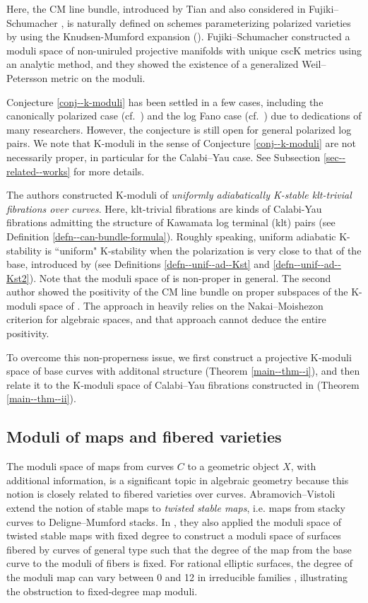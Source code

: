 \documentclass[12pt,twoside]{amsart}
\theoremstyle{definition}
\begin{document}
Here, the CM line bundle, introduced by Tian \cite{Tia97} and also considered in Fujiki--Schumacher \cite{FS}, is naturally defined on schemes parameterizing polarized varieties by using the Knudsen-Mumford expansion (\cite{PT,FR}). 
Fujiki--Schumacher \cite{FS} constructed a moduli space of non-uniruled projective manifolds with unique cscK metrics using an analytic method, and they showed the existence of a generalized Weil--Petersson metric on the moduli. 

Conjecture \ref{conj--k-moduli} has been settled in a few cases, including the canonically polarized case (cf.~\cite{kollar-moduli}) and the log Fano case (cf.~\cite{Xu}) due to dedications of many researchers. 
However, the conjecture is still open for general polarized log pairs.
We note that K-moduli in the sense of Conjecture \ref{conj--k-moduli} are not necessarily proper, in particular for the Calabi--Yau case.
See Subsection \ref{sec--related--works} for more details.


The authors \cite{HH} constructed K-moduli of {\it uniformly adiabatically K-stable klt-trivial fibrations over curves}. Here, klt-trivial fibrations are kinds of Calabi-Yau fibrations admitting the structure of Kawamata log terminal (klt) pairs (see Definition \ref{defn--can-bundle-formula}). Roughly speaking, uniform adiabatic K-stability is ``uniform" K-stability when the polarization is very close to that of the base, introduced by \cite{fibst} (see Definitions \ref{defn--unif--ad--Kst} and \ref{defn--unif--ad--Kst2}). Note that the moduli space of \cite{HH} is non-proper in general.
The second author \cite{Hat23} showed the positivity of the CM line bundle on proper subspaces of the K-moduli space of \cite{HH}.  The approach in \cite{Hat23} heavily relies on the Nakai--Moishezon criterion \cite{kollar-moduli-stable-surface-proj,FM3} for algebraic spaces, and that approach cannot deduce the entire positivity.


To overcome this non-properness issue, we first construct a projective K‑moduli space of base curves with additonal structure (Theorem \ref{main--thm--i}), and then relate it to the K‑moduli space of Calabi–Yau fibrations constructed in \cite{HH} (Theorem \ref{main--thm--ii}).


\subsection{Moduli of maps and fibered varieties}
The moduli space of maps from curves 
$C$ to a geometric object 
$X$, with additional information, is a significant topic in algebraic geometry because this notion is closely related to fibered varieties over curves. 
Abramovich--Vistoli \cite{AV} extend the notion of stable maps \cite{K,FP} to {\it twisted stable maps}, i.e. maps from stacky curves to Deligne--Mumford stacks.
In \cite{AV2}, they also applied the moduli space of twisted stable maps with fixed degree to construct a moduli space of surfaces fibered by curves of general type such that the degree of the map from the base curve to the moduli of fibers is fixed.
For rational elliptic surfaces, the degree of the moduli map can vary between 0 and 12 in irreducible families \cite[Table 6.1]{Mi}, illustrating the obstruction to fixed‑degree map moduli. 
\end{document}
